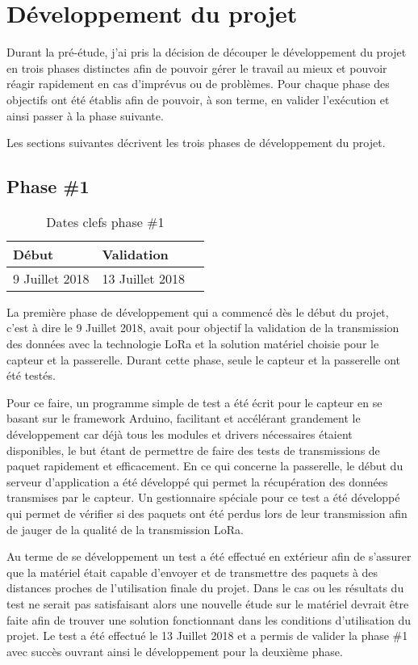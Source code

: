 ﻿
\chapter{Développement du projet}\label{ch:developpement}

Durant la pré-étude, j'ai pris la décision de découper le développement du projet en trois phases distinctes afin de pouvoir gérer le travail au mieux et pouvoir réagir rapidement en cas d'imprévus ou de problèmes. Pour chaque phase des objectifs ont été établis afin de pouvoir, à son terme, en valider l'exécution et ainsi passer à la phase suivante.

Les sections suivantes décrivent les trois phases de développement du projet.

\section{Phase \#1}

\begin{table}[htb]
\caption{Dates clefs phase \#1}
\label{tab:detail_phase_1}
\centering
\begin{tabular}{ l l l }
\toprule
Début & Validation \\
\midrule
9 Juillet 2018 & 13 Juillet 2018  \\
\bottomrule 
\end{tabular}
\end{table}

La première phase de développement qui a commencé dès le début du projet, c'est à dire le 9 Juillet 2018, avait pour objectif la validation de la transmission des données avec la technologie LoRa et la solution matériel choisie pour le capteur et la passerelle. Durant cette phase, seule le capteur et la passerelle ont été testés. 

Pour ce faire, un programme simple de test a été écrit pour le capteur en se basant sur le framework Arduino, facilitant et accélérant grandement le développement car déjà tous les modules et drivers nécessaires étaient disponibles, le but étant de permettre de faire des tests de transmissions de paquet rapidement et efficacement. En ce qui concerne la passerelle, le début du serveur d'application a été développé qui permet la récupération des données transmises par le capteur. Un gestionnaire spéciale pour ce test a été développé qui permet de vérifier si des paquets ont été perdus lors de leur transmission afin de jauger de la qualité de la transmission LoRa.

Au terme de se développement un test a été effectué en extérieur afin de s'assurer que la matériel était capable d'envoyer et de transmettre des paquets à des distances proches de l'utilisation finale du projet. Dans le cas ou les résultats du test ne serait pas satisfaisant alors une nouvelle étude sur le matériel devrait être faite afin de trouver une solution fonctionnant dans les conditions d'utilisation du projet. Le test a été effectué le 13 Juillet 2018 et a permis de valider la phase \#1 avec succès ouvrant ainsi le développement pour la deuxième phase.

